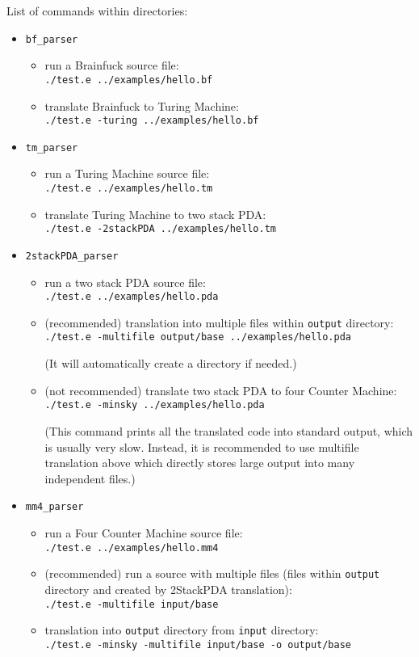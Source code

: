 \documentclass[english,shortabstract,mgr]{iithesis}
\begin{document}
List of commands within directories:
\begin{itemize}
  \item \texttt{bf\_parser}
    \begin{itemize}
      \item run a Brainfuck source file: \\ \texttt{./test.e ../examples/hello.bf}
      \item translate Brainfuck to Turing Machine: \\ \texttt{./test.e -turing ../examples/hello.bf}
    \end{itemize}
  \item \texttt{tm\_parser}
    \begin{itemize}
      \item run a Turing Machine source file: \\ \texttt{./test.e ../examples/hello.tm}
      \item translate Turing Machine to two stack PDA: \\ \texttt{./test.e -2stackPDA ../examples/hello.tm}
    \end{itemize}
  \item \texttt{2stackPDA\_parser}
    \begin{itemize}
      \item run a two stack PDA source file: \\ \texttt{./test.e ../examples/hello.pda}
      \item (recommended) translation into multiple files within \texttt{output}
        directory: \\ \texttt{./test.e -multifile output/base ../examples/hello.pda}

        (It will automatically create a directory if needed.)
      \item (not recommended) translate two stack PDA to four Counter Machine: \\ \texttt{./test.e -minsky ../examples/hello.pda}

        (This command prints all the translated code into standard output,
        which is usually very slow. Instead, it is recommended to use multifile
        translation above which directly stores large output into many independent
        files.)
    \end{itemize}
  \item \texttt{mm4\_parser}
    \begin{itemize}
      \item run a Four Counter Machine source file: \\ \texttt{./test.e ../examples/hello.mm4}
      \item (recommended) run a source with multiple files (files within \texttt{output}
        directory and created by 2StackPDA translation): \\ \texttt{./test.e -multifile input/base}
      \item translation into \texttt{output} directory from \texttt{input}
        directory: \\ \texttt{./test.e -minsky -multifile input/base -o output/base}


\end{itemize}
\end{itemize}
\end{document}
